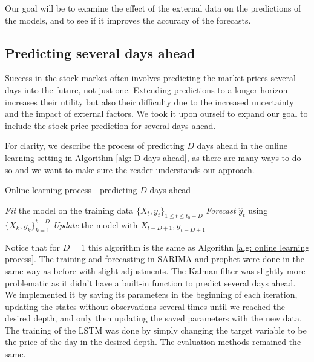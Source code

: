 \documentclass[12pt]{article}
\theoremstyle{definition}
\begin{document}
Our goal will be to examine the effect of the external data on the predictions of the models, and to see if it improves the accuracy of the forecasts.

\subsection{Predicting several days ahead}
Success in the stock market often involves predicting the market prices several days into the future, not just one. 
Extending predictions to a longer horizon increases their utility but also their difficulty due to the increased uncertainty and the impact of external factors.
We took it upon ourself to expand our goal to include the stock price prediction for several days ahead.

For clarity, we describe the process of predicting \(D\) days ahead in the online learning setting in Algorithm \ref{alg: D days ahead}, as there are many ways to do so and we want to make sure the reader understands our approach.

\begin{algorithm}[H]
  \caption{Online learning process - predicting \(D\) days ahead}
  \begin{algorithmic}
    \State \textit{Fit} the model on the training data $\{ X_t, y_t \}_{1 \leq t \leq t_0 - D}$  
      \State \textit{Forecast} $\hat{y}_t$ using $\{ X_k, y_k \}_{k=1}^{t-D}$
      \State \textit{Update} the model with $ X_{t-D+1}, y_{t-D+1} $  
    \EndFor
  \end{algorithmic}
  \label{alg: D days ahead}
\end{algorithm}

Notice that for $D=1$ this algorithm is the same as Algorithn \ref{alg: online learning process}.
The training and forecasting in SARIMA and prophet were done in the same way as before with slight adjustments.
The Kalman filter was slightly more problematic as it didn't have a built-in function to predict several days ahead. 
We implemented it by saving its parameters in the beginning of each iteration, updating the states without observations several times until we reached the desired depth, and only then updating the saved parameters with the new data.
The training of the LSTM was done by simply changing the target variable to be the price of the day in the desired depth.
The evaluation methods remained the same.
\end{document}
